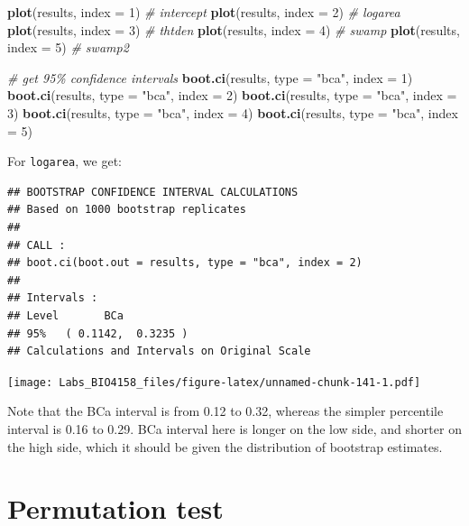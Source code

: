 \documentclass[
  12pt,
]{book}
\newenvironment{Shaded}{\begin{snugshade}}{\end{snugshade}}
\newcommand{\CommentTok}[1]{\textcolor[rgb]{0.56,0.35,0.01}{\textit{#1}}}
\newcommand{\DataTypeTok}[1]{\textcolor[rgb]{0.13,0.29,0.53}{#1}}
\newcommand{\DecValTok}[1]{\textcolor[rgb]{0.00,0.00,0.81}{#1}}
\newcommand{\KeywordTok}[1]{\textcolor[rgb]{0.13,0.29,0.53}{\textbf{#1}}}
\newcommand{\NormalTok}[1]{#1}
\newcommand{\StringTok}[1]{\textcolor[rgb]{0.31,0.60,0.02}{#1}}
\begin{document}
\begin{Shaded}
\begin{Highlighting}[]
\KeywordTok{plot}\NormalTok{(results, }\DataTypeTok{index =} \DecValTok{1}\NormalTok{) }\CommentTok{\# intercept}
\KeywordTok{plot}\NormalTok{(results, }\DataTypeTok{index =} \DecValTok{2}\NormalTok{) }\CommentTok{\# logarea}
\KeywordTok{plot}\NormalTok{(results, }\DataTypeTok{index =} \DecValTok{3}\NormalTok{) }\CommentTok{\# thtden}
\KeywordTok{plot}\NormalTok{(results, }\DataTypeTok{index =} \DecValTok{4}\NormalTok{) }\CommentTok{\# swamp}
\KeywordTok{plot}\NormalTok{(results, }\DataTypeTok{index =} \DecValTok{5}\NormalTok{) }\CommentTok{\# swamp2}

\CommentTok{\# get 95\% confidence intervals}
\KeywordTok{boot.ci}\NormalTok{(results, }\DataTypeTok{type =} \StringTok{"bca"}\NormalTok{, }\DataTypeTok{index =} \DecValTok{1}\NormalTok{)}
\KeywordTok{boot.ci}\NormalTok{(results, }\DataTypeTok{type =} \StringTok{"bca"}\NormalTok{, }\DataTypeTok{index =} \DecValTok{2}\NormalTok{)}
\KeywordTok{boot.ci}\NormalTok{(results, }\DataTypeTok{type =} \StringTok{"bca"}\NormalTok{, }\DataTypeTok{index =} \DecValTok{3}\NormalTok{)}
\KeywordTok{boot.ci}\NormalTok{(results, }\DataTypeTok{type =} \StringTok{"bca"}\NormalTok{, }\DataTypeTok{index =} \DecValTok{4}\NormalTok{)}
\KeywordTok{boot.ci}\NormalTok{(results, }\DataTypeTok{type =} \StringTok{"bca"}\NormalTok{, }\DataTypeTok{index =} \DecValTok{5}\NormalTok{)}
\end{Highlighting}
\end{Shaded}

For \texttt{logarea}, we get:

\begin{verbatim}
## BOOTSTRAP CONFIDENCE INTERVAL CALCULATIONS
## Based on 1000 bootstrap replicates
## 
## CALL : 
## boot.ci(boot.out = results, type = "bca", index = 2)
## 
## Intervals : 
## Level       BCa          
## 95%   ( 0.1142,  0.3235 )  
## Calculations and Intervals on Original Scale
\end{verbatim}

\texttt{[image: Labs\_BIO4158\_files/figure-latex/unnamed-chunk-141-1.pdf]}

Note that the BCa interval is from 0.12 to 0.32, whereas the simpler percentile interval is 0.16 to 0.29. BCa interval here is longer on the low side, and shorter on the high side, which it should be given the distribution of bootstrap estimates.

\hypertarget{permutation-test-1}{%
\section{Permutation test}\label{permutation-test-1}}
\end{document}
